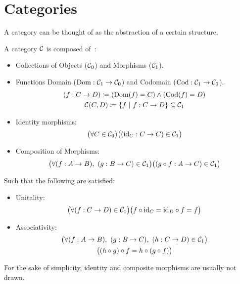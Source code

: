 \section{Categories}
A category can be thought of as the abstraction of a certain structure.

\begin{definition}[Category]
  A category $\mathcal{C}$ is composed of~\parencite[p.~4]{awodey:category_theory}:
  \begin{itemize}
    \item Collections of Objects ($\mathcal{C}_0$) and Morphisms ($\mathcal{C}_1$).
    \item Functions Domain ($\mathrm{Dom}:\mathcal{C}_1\to \mathcal{C}_0$) and Codomain
      ($\mathrm{Cod}: \mathcal{C}_1 \to \mathcal{C}_0$).
      \[
        \begin{gathered}
          (f : C\to D)
          \coloneqq (\mathrm{Dom}(f) = C) \land (\mathrm{Cod}(f) = D)\\
          \mathcal{C}(C, D) \coloneqq \{f\ |\ f : C \to D\}\subseteq \mathcal{C}_1
        \end{gathered}
      \]
    \item Identity morphisms:
      \[\big(\forall C \in \mathcal{C}_0\big)
        \big((\mathrm{id}_C : C\to C)\in \mathcal{C}_1\big)\]
    \item Composition of Morphisms:
      \[\big(\forall (f:A \to B),\ (g : B\to C) \in \mathcal{C}_1\big)
        \big((g\circ f:A\to C) \in \mathcal{C}_1\big)\]
  \end{itemize}

  Such that the following are satisfied:
  \begin{itemize}
    \item Unitality:
      \[\big(\forall (f:C\to D)\in \mathcal{C}_1\big)
        \big(f \circ \mathrm{id}_C = \mathrm{id}_D \circ f = f\big)\]
    \item Associativity:
      \[
        \begin{gathered}
          \big(\forall (f : A\to B),\ (g: B\to C),\ (h: C\to D)\in\mathcal{C}_1\big)\\
          \big((h \circ g) \circ f = h \circ (g \circ f)\big)
        \end{gathered}
      \]
  \end{itemize}
\end{definition}

\begin{remark}
  For the sake of simplicity, identity and composite morphisms are usually not
  drawn.
\end{remark}

